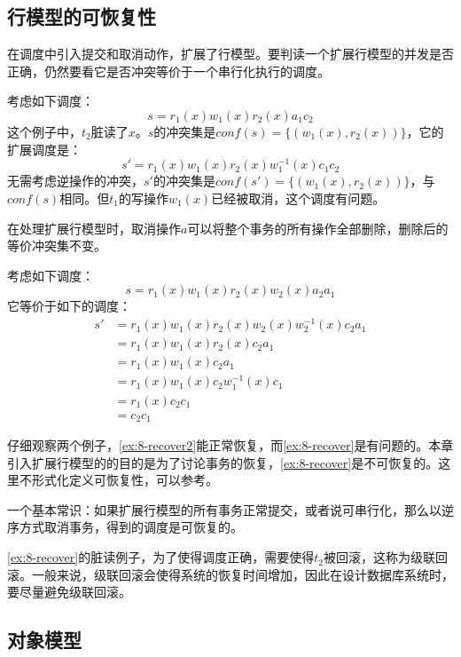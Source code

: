 \subsection{行模型的可恢复性}

在调度中引入提交和取消动作，扩展了行模型。要判读一个扩展行模型的并发是否正确，仍然要看它是否冲突等价于一个串行化执行的调度。

\begin{example}\label{ex:8-recover}
考虑如下调度：
$$
s = r_1(x)w_1(x)r_2(x)a_1c_2
$$
这个例子中，$t_2$脏读了$x$。$s$的冲突集是$conf(s)=\{ (w_1(x),r_2(x))\}$，它的扩展调度是：
$$
s' = r_1(x)w_1(x)r_2(x)w_1^{-1}(x)c_1c_2
$$
无需考虑逆操作的冲突，$s'$的冲突集是$conf(s')=\{ (w_1(x),r_2(x))\}$，与$conf(s)$相同。但$t_1$的写操作$w_1(x)$已经被取消，这个调度有问题。
\end{example}

在处理扩展行模型时，取消操作$a$可以将整个事务的所有操作全部删除，删除后的等价冲突集不变。

\begin{example}\label{ex:8-recover2}
    考虑如下调度：
$$
s=r_1(x)w_1(x)r_2(x)w_2(x)a_2a_1
$$
它等价于如下的调度：
\begin{align*}
s' &= r_1(x)w_1(x)r_2(x)w_2(x)w_2^{-1}(x)c_2a_1 \\
   &= r_1(x)w_1(x)r_2(x)c_2a_1 \\
   &= r_1(x)w_1(x)c_2a_1 \\
   &= r_1(x)w_1(x)c_2w_1^{-1}(x)c_1 \\
   &= r_1(x)c_2c_1 \\
   &= c_2c_1
\end{align*}
\end{example}

仔细观察两个例子，\examplename\ref{ex:8-recover2}能正常恢复，而\examplename\ref{ex:8-recover}是有问题的。本章引入扩展行模型的的目的是为了讨论事务的恢复，\examplename\ref{ex:8-recover}是不可恢复的。这里不形式化定义可恢复性，可以参考\cite{Weikum2001Transactional}。

一个基本常识：如果扩展行模型的所有事务正常提交，或者说可串行化，那么以逆序方式取消事务，得到的调度是可恢复的。

\examplename\ref{ex:8-recover}的脏读例子，为了使得调度正确，需要使得$t_2$被回滚，这称为级联回滚。一般来说，级联回滚会使得系统的恢复时间增加，因此在设计数据库系统时，要尽量避免级联回滚。

\subsection{对象模型}

